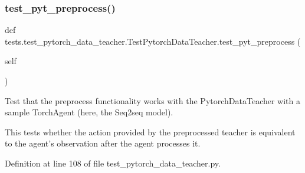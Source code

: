 \subsubsection{\texorpdfstring{test\+\_\+pyt\+\_\+preprocess()}{test\_pyt\_preprocess()}}
{\footnotesize\ttfamily def tests.\+test\+\_\+pytorch\+\_\+data\+\_\+teacher.\+Test\+Pytorch\+Data\+Teacher.\+test\+\_\+pyt\+\_\+preprocess (\begin{DoxyParamCaption}\item[{}]{self }\end{DoxyParamCaption})}

\begin{DoxyVerb}Test that the preprocess functionality works with the PytorchDataTeacher with a
sample TorchAgent (here, the Seq2seq model).

This tests whether the action provided by the preprocessed teacher is equivalent
to the agent's observation after the agent processes it.
\end{DoxyVerb}
 

Definition at line 108 of file test\+\_\+pytorch\+\_\+data\+\_\+teacher.\+py.


